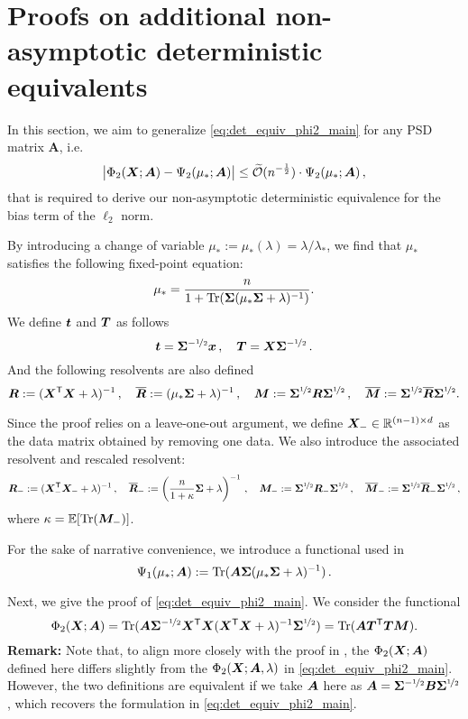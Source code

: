 \section{Proofs on additional non-asymptotic deterministic equivalents}
\label{app:proof_non-asy_results}

In this section, we aim to generalize \cref{eq:det_equiv_phi2_main} for any PSD matrix $\bm A$, i.e.
\begin{equation*}
         \big\vert \Phi_2({\boldsymbol X};{\boldsymbol A}) - \Psi_2 (\mu_* ; {\boldsymbol A}) \big\vert \leq \widetilde{\mathcal{O}}(n^{-\frac{1}{2}}) \cdot \Psi_2 (\mu_* ; {\boldsymbol A}) \,,
\end{equation*}
that is required to derive our non-asymptotic deterministic equivalence for the bias term of the $\ell_2$ norm.


By introducing a change of variable $\mu_* := \mu_* (\lambda) = \lambda / \lambda_*$, we find that $\mu_*$ satisfies the following fixed-point equation:
\begin{align}\label{eq:det_equiv_fixed_point_mu_star}
    \mu_* = \frac{n}{1 + {\rm Tr}({\boldsymbol \Sigma} (\mu_* {\boldsymbol \Sigma} + \lambda)^{-1} )}.
\end{align}
We define \({\boldsymbol t}\) and \({\boldsymbol T}\) as follows
\[
    {\boldsymbol t} = {\boldsymbol \Sigma}^{-\nicefrac{1}{2}}{\boldsymbol x}\,, \quad {\boldsymbol T} = {\boldsymbol X}{\boldsymbol \Sigma}^{-\nicefrac{1}{2}}\,. 
\]
And the following resolvents are also defined 
\[
    {\boldsymbol R} := ({\boldsymbol X}^{\mathsf T} {\boldsymbol X} + \lambda)^{-1}\,, \quad \overline{{\boldsymbol R}} := (\mu_*{\boldsymbol \Sigma} + \lambda)^{-1}\,, \quad 
    {\boldsymbol M} := {\boldsymbol \Sigma}^{\nicefrac{1}{2}} {\boldsymbol R} {\boldsymbol \Sigma}^{\nicefrac{1}{2}}\,, \quad \overline{{\boldsymbol M}} := {\boldsymbol \Sigma}^{\nicefrac{1}{2}} \overline{{\boldsymbol R}} {\boldsymbol \Sigma}^{\nicefrac{1}{2}}.
\]

Since the proof relies on a leave-one-out argument, we define \({\boldsymbol X}_- \in \mathbb{R}^{(n-1) \times d}\) as the data matrix obtained by removing one data. We also introduce the associated resolvent and rescaled resolvent:
\[
    {\boldsymbol R}_- := ({\boldsymbol X}_-^{\mathsf T} {\boldsymbol X}_- + \lambda)^{-1}\,, \quad
    \overline{{\boldsymbol R}}_- :=\left(\frac{n}{1+\kappa}{\boldsymbol \Sigma} + \lambda\right)^{-1}\,, \quad {\boldsymbol M}_- := {\boldsymbol \Sigma}^{\nicefrac{1}{2}} {\boldsymbol R}_- {\boldsymbol \Sigma}^{\nicefrac{1}{2}}\,, \quad \overline{{\boldsymbol M}}_- := {\boldsymbol \Sigma}^{\nicefrac{1}{2}} \overline{{\boldsymbol R}}_- {\boldsymbol \Sigma}^{\nicefrac{1}{2}}\,,
\]
where \(\kappa = \mathbb{E}[{\rm Tr}({\boldsymbol M}_-)]\).

For the sake of narrative convenience, we introduce a functional used in \cite{misiakiewicz2024non}
\[
\Psi_1(\mu_*; {\boldsymbol A}) := {\rm Tr}({\boldsymbol A}{\boldsymbol \Sigma}(\mu_*{\boldsymbol \Sigma} + \lambda)^{-1})\,.
\]

Next, we give the proof of \cref{eq:det_equiv_phi2_main}. We consider the functional
\[
\Phi_2 ({\boldsymbol X} ; {\boldsymbol A}) = {\rm Tr}({\boldsymbol A} {\boldsymbol \Sigma}^{-\nicefrac{1}{2}} {\boldsymbol X}^{\mathsf T} {\boldsymbol X} ( {\boldsymbol X}^{\mathsf T} {\boldsymbol X} + \lambda)^{-1}{\boldsymbol \Sigma}^{\nicefrac{1}{2}} ) = {\rm Tr}( {\boldsymbol A} {\boldsymbol T}^{\mathsf T} {\boldsymbol T} {\boldsymbol M})  .
\]
{\bf Remark:} Note that, to align more closely with the proof in \cite{misiakiewicz2024non}, the \(\Phi_2 ({\boldsymbol X}; {\boldsymbol A})\) defined here differs slightly from the \(\Phi_2 ({\boldsymbol X}; {\boldsymbol A}, \lambda)\) in \cref{eq:det_equiv_phi2_main}. However, the two definitions are equivalent if we take \({\boldsymbol A}\) here as \({\boldsymbol A} = {\boldsymbol \Sigma}^{-\nicefrac{1}{2}} {\boldsymbol B} {\boldsymbol \Sigma}^{\nicefrac{1}{2}}\), which recovers the formulation in \cref{eq:det_equiv_phi2_main}.


